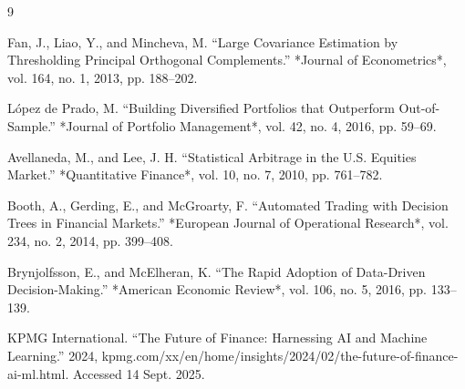\documentclass{article}
\begin{document}
\begin{thebibliography}{9}

Fan, J., Liao, Y., and Mincheva, M. “Large Covariance Estimation by Thresholding Principal Orthogonal Complements.” *Journal of Econometrics*, vol. 164, no. 1, 2013, pp. 188–202.

López de Prado, M. “Building Diversified Portfolios that Outperform Out-of-Sample.” *Journal of Portfolio Management*, vol. 42, no. 4, 2016, pp. 59–69.

Avellaneda, M., and Lee, J. H. “Statistical Arbitrage in the U.S. Equities Market.” *Quantitative Finance*, vol. 10, no. 7, 2010, pp. 761–782.

Booth, A., Gerding, E., and McGroarty, F. “Automated Trading with Decision Trees in Financial Markets.” *European Journal of Operational Research*, vol. 234, no. 2, 2014, pp. 399–408.

Brynjolfsson, E., and McElheran, K. “The Rapid Adoption of Data-Driven Decision-Making.” *American Economic Review*, vol. 106, no. 5, 2016, pp. 133–139.

KPMG International. “The Future of Finance: Harnessing AI and Machine Learning.” 2024, kpmg.com/xx/en/home/insights/2024/02/the-future-of-finance-ai-ml.html. Accessed 14 Sept. 2025.

\end{thebibliography}
\end{document}
